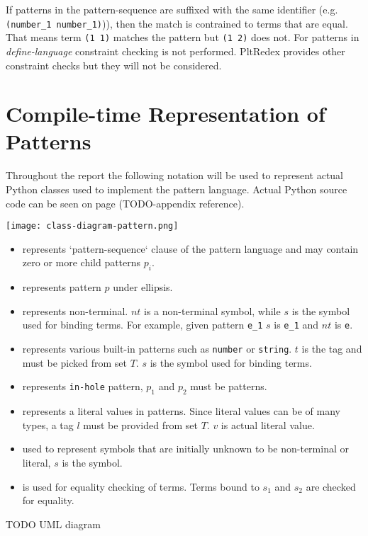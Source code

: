 If patterns in the pattern-sequence are suffixed with the same identifier (e.g. \texttt{(number\_1 number\_1)})), then the match is contrained to terms that are equal. That means term \texttt{(1 1)} matches the pattern but \texttt{(1 2)} does not. For patterns in \textit{define-language} constraint checking is not performed. PltRedex provides other constraint checks but they will not be considered.

\section{Compile-time Representation of Patterns}

Throughout the report the following notation will be used to represent actual Python classes used to implement the pattern language. Actual Python source code can be seen on page (TODO-appendix reference). 

\texttt{[image: class-diagram-pattern.png]}


\begin{itemize}
\item
\PatternSequence represents `pattern-sequence` clause of the pattern language and may contain zero or more child patterns $p_i$.

\item 
\Repeat represents pattern $p$ under ellipsis.

\item 
\Nt represents non-terminal. $nt$ is a non-terminal symbol, while $s$ is the symbol used for binding terms. For example, given pattern \texttt{e\_1} $s$ is \texttt{e\_1} and $nt$ is \texttt{e}.
\item
\BuiltInPattern represents various built-in patterns such as \texttt{number} or \texttt{string}. $t$ is the tag and must be picked from set $T$. $s$ is the symbol used for binding terms.

\item
\InHolePattern represents \texttt{in-hole} pattern, $p_1$ and $p_2$ must be patterns.

\item 
\LiteralPattern represents a literal values in patterns. Since literal values can be of many types, a tag $l$ must be provided from set $T$. $v$ is actual literal value.

\item 
\UnresolvedSymbol used to represent symbols that are initially unknown to be non-terminal or literal, $s$ is the symbol.

\item
\CheckConstraint is used for equality checking of terms. Terms bound to $s_1$ and $s_2$ are checked for equality.

\end{itemize}

TODO UML diagram





